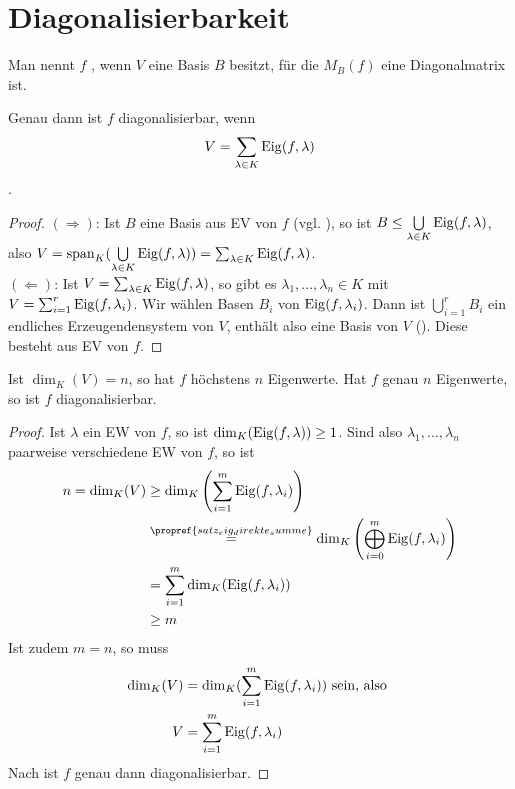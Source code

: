 \section{Diagonalisierbarkeit}

\begin{definition}[diagonalisierbar]
	Man nennt $f$ , wenn $V$ eine Basis $B$ besitzt, für die $M_B(f)$ eine Diagonalmatrix ist.
\end{definition}

\begin{lemma}
	Genau dann ist $f$ diagonalisierbar, wenn
	\begin{align}
		V=\sum\limits_{\lambda\in K} \operatorname{Eig}(f,\lambda) \notag
	\end{align}.
\end{lemma}
\begin{proof}
	$(\Rightarrow)$: Ist $B$ eine Basis aus EV von $f$ (vgl. ), so ist $B\le \bigcup\limits_{\lambda\in K}\operatorname{Eig}(f,\lambda)$, also $V=\operatorname{span}_K(\bigcup\limits_{\lambda\in K}\operatorname{Eig}(f, \lambda))=\sum_{\lambda\in K}\operatorname{Eig}(f,\lambda)$. \\
	$(\Leftarrow)$: Ist $V=\sum_{\lambda\in K}\operatorname{Eig}(f,\lambda)$, so gibt es $\lambda_1,...,\lambda_n \in K$ mit $V=\sum_{i=1}^r \operatorname{Eig}(f,\lambda_i)$. Wir wählen Basen $B_i$ von $\operatorname{Eig}(f,\lambda_i)$. Dann ist $\bigcup\limits_{i=1}^r B_i$ ein endliches Erzeugendensystem von $V$, enthält also eine Basis von $V$ (). Diese besteht aus EV von $f$.
\end{proof}

\begin{proposition}
	Ist $\dim_K(V)=n$, so hat $f$ höchstens $n$ Eigenwerte. Hat $f$ genau $n$ Eigenwerte, so ist $f$ diagonalisierbar.
\end{proposition}
\begin{proof}
	Ist $\lambda$ ein EW von $f$, so ist $\dim_K(\operatorname{Eig}(f,\lambda))\ge 1$. Sind also $\lambda_1,...,\lambda_n$ paarweise verschiedene EW von $f$, so ist
	\begin{align}
		n=\dim_K(V)&\ge \dim_K\left( \sum\limits_{i=1}^m \Eig(f,\lambda_i)\right) \notag \\
		&\overset{\propref{satz_eig_direkte_summe}}{=} \dim_K\left( \bigoplus_{i=0}^{m} \Eig(f,\lambda_i)\right) \notag \\
		&= \sum\limits_{i=1}^m \dim_K(\Eig(f,\lambda_i)) \notag \\
		&\ge m \notag
	\end{align}
	Ist zudem $m=n$, so muss 
	\begin{align}
		\dim_K(V) &= \dim_K(\sum\limits_{i=1}^m \operatorname{Eig}(f,\lambda_i))\text{ sein, also }\notag \\
		V&= \sum\limits_{i=1}^m \operatorname{Eig}(f,\lambda_i) \notag
	\end{align}
	Nach  ist $f$ genau dann diagonalisierbar.
\end{proof}

